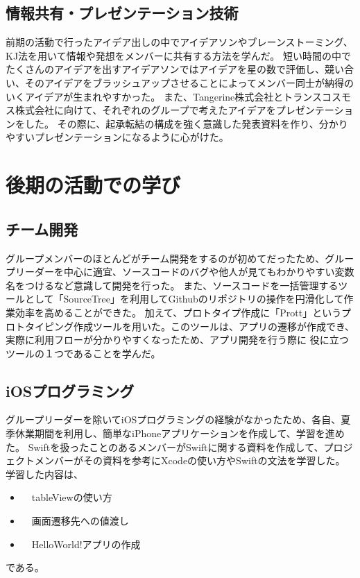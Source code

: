 \documentclass[openany,11pt,papersize]{jsbook}
\begin{document}

\subsection{情報共有・プレゼンテーション技術}
前期の活動で行ったアイデア出しの中でアイデアソンやブレーンストーミング、KJ法を用いて情報や発想をメンバーに共有する方法を学んだ。
短い時間の中でたくさんのアイデアを出すアイデアソンではアイデアを星の数で評価し、競い合い、そのアイデアをブラッシュアップさせることによってメンバー同士が納得のいくアイデアが生まれやすかった。
また、Tangerine株式会社とトランスコスモス株式会社に向けて、それぞれのグループで考えたアイデアをプレゼンテーションをした。
その際に、起承転結の構成を強く意識した発表資料を作り、分かりやすいプレゼンテーションになるように心がけた。


\section{後期の活動での学び}
\subsection{チーム開発}
グループメンバーのほとんどがチーム開発をするのが初めてだったため、グループリーダーを中心に適宜、ソースコードのバグや他人が見てもわかりやすい変数名をつけるなど意識して開発を行った。
また、ソースコードを一括管理するツールとして「SourceTree」を利用してGithubのリポジトリの操作を円滑化して作業効率を高めることができた。
加えて、プロトタイプ作成に「Prott」というプロトタイピング作成ツールを用いた。このツールは、アプリの遷移が作成でき、実際に利用フローが分かりやすくなったため、アプリ開発を行う際に
役に立つツールの１つであることを学んだ。


\subsection{iOSプログラミング}
グループリーダーを除いてiOSプログラミングの経験がなかったため、各自、夏季休業期間を利用し、簡単なiPhoneアプリケーションを作成して、学習を進めた。
Swiftを扱ったことのあるメンバーがSwiftに関する資料を作成して、プロジェクトメンバーがその資料を参考にXcodeの使い方やSwiftの文法を学習した。
学習した内容は、
\begin{itemize}

\item　tableViewの使い方
\item　画面遷移先への値渡し
\item　HelloWorld!アプリの作成

\end{itemize}
である。
\end{document}
